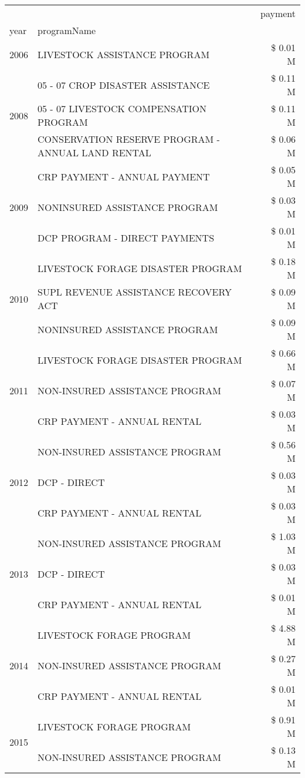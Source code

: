 \begin{tabular}{llr}
\toprule
 &  & payment \\
year & programName &  \\
\midrule
2006 & LIVESTOCK ASSISTANCE PROGRAM & \$ 0.01 M \\
\cline{1-3}
\multirow[t]{3}{*}{2008} & 05 - 07 CROP DISASTER ASSISTANCE & \$ 0.11 M \\
 & 05 - 07 LIVESTOCK COMPENSATION PROGRAM & \$ 0.11 M \\
 & CONSERVATION RESERVE PROGRAM - ANNUAL LAND RENTAL & \$ 0.06 M \\
\cline{1-3}
\multirow[t]{3}{*}{2009} & CRP PAYMENT - ANNUAL PAYMENT & \$ 0.05 M \\
 & NONINSURED ASSISTANCE PROGRAM & \$ 0.03 M \\
 & DCP PROGRAM - DIRECT PAYMENTS & \$ 0.01 M \\
\cline{1-3}
\multirow[t]{3}{*}{2010} & LIVESTOCK FORAGE DISASTER  PROGRAM & \$ 0.18 M \\
 & SUPL REVENUE ASSISTANCE RECOVERY ACT & \$ 0.09 M \\
 & NONINSURED ASSISTANCE PROGRAM & \$ 0.09 M \\
\cline{1-3}
\multirow[t]{3}{*}{2011} & LIVESTOCK FORAGE DISASTER PROGRAM & \$ 0.66 M \\
 & NON-INSURED ASSISTANCE PROGRAM & \$ 0.07 M \\
 & CRP PAYMENT - ANNUAL RENTAL & \$ 0.03 M \\
\cline{1-3}
\multirow[t]{3}{*}{2012} & NON-INSURED ASSISTANCE PROGRAM & \$ 0.56 M \\
 & DCP - DIRECT & \$ 0.03 M \\
 & CRP PAYMENT - ANNUAL RENTAL & \$ 0.03 M \\
\cline{1-3}
\multirow[t]{3}{*}{2013} & NON-INSURED ASSISTANCE PROGRAM & \$ 1.03 M \\
 & DCP - DIRECT & \$ 0.03 M \\
 & CRP PAYMENT - ANNUAL RENTAL & \$ 0.01 M \\
\cline{1-3}
\multirow[t]{3}{*}{2014} & LIVESTOCK FORAGE PROGRAM & \$ 4.88 M \\
 & NON-INSURED ASSISTANCE PROGRAM & \$ 0.27 M \\
 & CRP PAYMENT - ANNUAL RENTAL & \$ 0.01 M \\
\cline{1-3}
\multirow[t]{3}{*}{2015} & LIVESTOCK FORAGE PROGRAM & \$ 0.91 M \\
 & NON-INSURED ASSISTANCE PROGRAM & \$ 0.13 M \\

\end{tabular}
